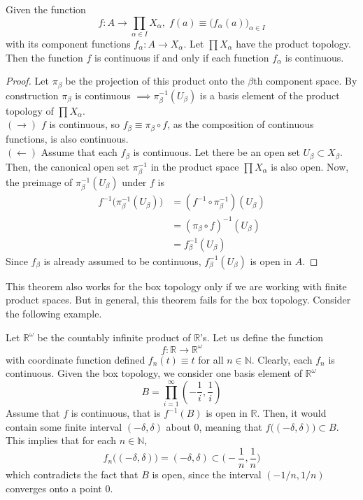 \documentclass{article}
\begin{document}
    \begin{theorem}
    Given the function 
    \[f: A \longrightarrow \prod_{\alpha \in I} X_\alpha, \; f(a) \equiv \big( f_\alpha (a) \big)_{\alpha \in I}\]
    with its component functions $f_\alpha: A \longrightarrow X_\alpha$. Let $\prod X_\alpha$ have the product topology. Then the function $f$ is continuous if and only if each function $f_\alpha$ is continuous. 
    \end{theorem}
    \begin{proof}
    Let $\pi_\beta$ be the projection of this product onto the $\beta$th component space. By construction $\pi_\beta$ is continuous $\implies \pi_\beta^{-1} (U_\beta)$ is a basis element of the product topology of $\prod X_\alpha$. \\
    $(\rightarrow)$ $f$ is continuous, so $f_\beta \equiv \pi_\beta \circ f$, as the composition of continuous functions, is also continuous. \\
    $(\leftarrow)$ Assume that each $f_\beta$ is continuous. Let there be an open set $U_\beta \subset X_\beta$. Then, the canonical open set $\pi_\beta^{-1}$ in the product space $\prod X_\alpha$ is also open. Now, the preimage of $\pi_\beta^{-1} (U_\beta)$ under $f$ is \begin{align*}
        f^{-1} \big( \pi_\beta^{-1} (U_\beta)\big) & = (f^{-1} \circ \pi_\beta^{-1})(U_\beta) \\
        & = (\pi_\beta \circ f)^{-1} (U_\beta) \\
        & = f_\beta^{-1} (U_\beta)
    \end{align*}
    Since $f_\beta$ is already assumed to be continuous, $f_\beta^{-1} (U_\beta)$ is open in $A$. 
    \end{proof}

    This theorem also works for the box topology only if we are working with finite product spaces. But in general, this theorem fails for the box topology. Consider the following example. 

    \begin{example}
    Let $\mathbb{R}^\omega$ be the countably infinite product of $\mathbb{R}$'s. Let us define the function 
    \[f: \mathbb{R} \longrightarrow \mathbb{R}^\omega\]
    with coordinate function defined $f_n (t) \equiv t$ for all $n \in \mathbb{N}$. Clearly, each $f_n$ is continuous. Given the box topology, we consider one basis element of $\mathbb{R}^\omega$
    \[B = \prod_{i=1}^\infty (-\frac{1}{i}, \frac{1}{i})\]
    Assume that $f$ is continuous, that is $f^{-1}(B)$ is open in $\mathbb{R}$. Then, it would contain some finite interval $(-\delta, \delta)$ about $0$, meaning that $f\big( (-\delta, \delta)\big) \subset B$. This implies that for each $n \in \mathbb{N}$, 
    \[f_n \big( (-\delta, \delta) \big) = (-\delta, \delta) \subset \Big( -\frac{1}{n}, \frac{1}{n} \Big)\]
    which contradicts the fact that $B$ is open, since the interval $(-1/n, 1/n)$ converges onto a point $0$. 
    \end{example}
\end{document}
